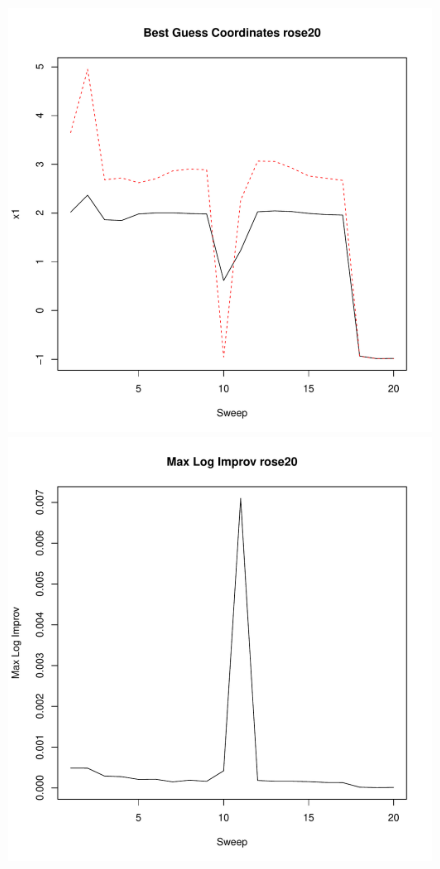 \documentclass{article}
\begin{document}
\clearpage

\begin{figure}
	\begin{center}
		\begin{minipage}[h!]{0.49\textwidth}
			\includegraphics[width=1.0\textwidth]{rose20Coord.pdf}
		\end{minipage}
		\begin{minipage}[h!]{0.49\textwidth}
			\includegraphics[width=1.0\textwidth]{rose20MLI.pdf}	
		\end{minipage}
	\end{center}
\end{figure}
\end{document}
